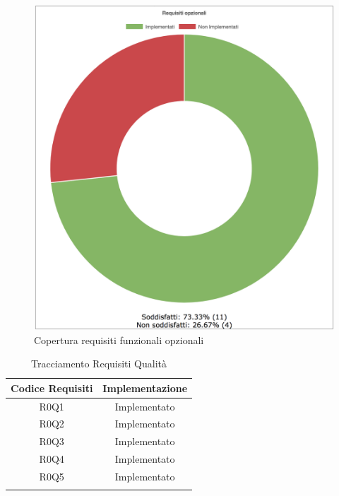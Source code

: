 \begin{figure}[H]
	\centering
	\includegraphics[scale = 0.6]{Images/opzionali.png}
	\caption{Copertura requisiti funzionali opzionali}
	\label{img:seqGraph}
\end{figure}

\begin{longtable}{|c|c|}
	\hline
	\textbf{Codice Requisiti} & \textbf{Implementazione} \\
	\hline
	\endhead
	R0Q1 & Implementato\\
	\hline
	R0Q2 & Implementato\\
	\hline
	R0Q3 & Implementato\\
	\hline
	R0Q4 & Implementato\\
	\hline
	R0Q5 & Implementato\\
	\hline
	\caption[Tracciamento Requisiti Qualità]{Tracciamento Requisiti Qualità}
\end{longtable}

